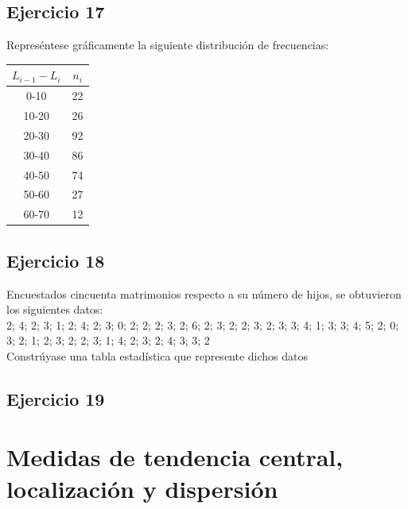 \documentclass[11pt,letterpaper]{report}
\begin{document}
      \subsection*{Ejercicio 17}
        Represéntese gráficamente la siguiente distribución de frecuencias:
        \begin{table}[!h]
            \centering
            \begin{tabular}{|c|c|}
                \hline
                $L_{i-1}-L_i$  & $n_i$\\
                \hline
                0-10& 22\\
                \hline
                10-20& 26\\
                \hline
                20-30& 92\\
                \hline
                30-40& 86\\
                \hline
                40-50& 74\\
                \hline
                50-60& 27\\
                \hline
                60-70& 12\\
                \hline
            \end{tabular}
        \end{table}
      \subsection*{Ejercicio 18}
        Encuestados cincuenta matrimonios respecto a su número de hijos, se obtuvieron los siguientes datos:\\

        2; 4; 2; 3; 1; 2; 4; 2; 3; 0; 2; 2; 2; 3; 2; 6; 2; 3; 2; 2; 3; 2; 3; 3; 4; 1; 3; 3; 4; 5; 2; 0; 3; 2; 1; 2; 3; 2; 2; 3; 1; 4; 2; 3; 2; 4; 3; 3; 2\\

        Constrúyase una tabla estadística que represente dichos datos
      \subsection*{Ejercicio 19}



    \section{Medidas de tendencia central, localización y dispersión}
\end{document}
